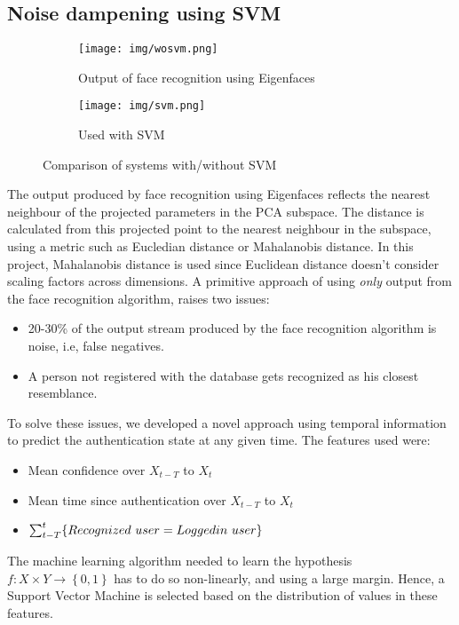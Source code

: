 \documentclass[12pt]{article}			%
\begin{document}
\subsection{Noise dampening using SVM}
\begin{figure}[h!]
        \begin{subfigure}[b]{0.6\textwidth}
                \centering
                \texttt{[image: img/wosvm.png]}
                \caption{Output of face recognition using Eigenfaces}
                \label{fig:svm1}
        \end{subfigure}%
        \begin{subfigure}[b]{0.5\textwidth}
                \centering
                \texttt{[image: img/svm.png]}
                \caption{Used with SVM}
                \label{fig:svm2}
        \end{subfigure}
        \caption{Comparison of systems with/without SVM}\label{fig:pwd}
\end{figure}
The output produced by face recognition using Eigenfaces reflects the nearest neighbour of the projected parameters in the PCA subspace.
The distance is calculated from this projected point to the nearest neighbour in the subspace, using a metric such as Eucledian distance or Mahalanobis distance.
In this project, Mahalanobis distance is used since Euclidean distance doesn't consider scaling factors across dimensions. 
A primitive approach of using \emph{only} output from the face recognition algorithm, raises two issues:
\begin{itemize}
	\item 20-30\% of the output stream produced by the face recognition algorithm is noise, i.e, false negatives.
	\item A person not registered with the database gets recognized as his closest resemblance.
\end{itemize}
To solve these issues, we developed a novel approach using temporal information to predict the authentication state at any given time.
The features used were:
\begin{itemize}
	\item Mean confidence over $X_{t-T}$ to $X_{t}$
	\item Mean time since authentication over $X_{t-T}$ to $X_{t}$
	\item $\sum _{t-T}^{t}\{Recognized\ user = Logged\-in\ user\}$
\end{itemize}
The machine learning algorithm needed to learn the hypothesis $f: X \times Y \rightarrow \left\{0,1\right\}$ has to do so non-linearly, and using a large margin. Hence, a Support Vector Machine is selected based on the distribution of values in these features.\\
\end{document}
